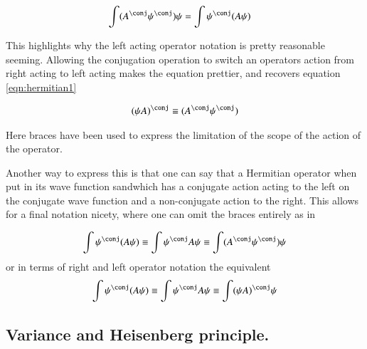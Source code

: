 \documentclass{article}
\begin{document}
\begin{align*}
\int (A^\conj \psi^\conj) \psi &= \int \psi^\conj (A \psi)
\end{align*}

This highlights why the left acting operator notation is pretty reasonable
seeming.  Allowing the conjugation operation to switch an operators action
from right acting to left acting makes the equation prettier, and 
recovers equation \ref{eqn:hermitian1}

\begin{align*}
(\psi A)^\conj \equiv (A^\conj \psi^\conj) 
\end{align*}

Here braces have been used to express the limitation of the scope of the action of the operator.

Another way to express this is that one can say that a Hermitian operator when put 
in its wave function sandwhich has a 
conjugate action acting to the left on the conjugate wave function and a non-conjugate
action to the right.  This allows for a final notation nicety, where one can omit the 
braces entirely as in

\begin{align*}
\int \psi^\conj (A \psi) \equiv \int \psi^\conj A \psi \equiv \int (A^\conj \psi^\conj) \psi
\end{align*}
or in terms of right and left operator notation the equivalent
\begin{align*}
\int \psi^\conj (A \psi) \equiv \int \psi^\conj A \psi \equiv \int (\psi A)^\conj \psi
\end{align*}

%
%
%


\subsection{ Variance and Heisenberg principle. }
\end{document}
